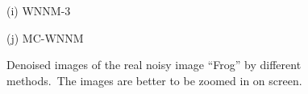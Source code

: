 \documentclass[10pt,onecolumn,letterpaper]{article}
\begin{document}
\begin{figure}[!htbp]
{\begin{minipage}[t]{0.3\textwidth}
{\footnotesize (i) WNNM-3 \cite{wnnm}   }
\end{minipage}
\begin{minipage}[t]{0.3\textwidth}
\centering
{}
{\footnotesize (j) MC-WNNM  }
\end{minipage}
}
\vspace{-1mm}
\caption{Denoised images of the real noisy image ``Frog'' \cite{ncwebsite} by different methods.\ The images are better to be zoomed in on screen.}
\label{f7}
\end{figure}
\end{document}
